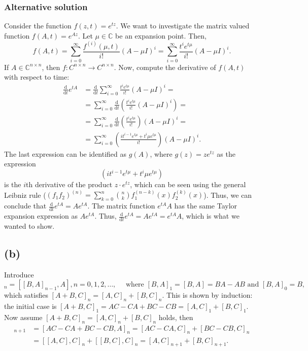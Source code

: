 \subsubsection*{Alternative solution}
Consider the function $f(z,t) = e^{tz}$. We want to investigate the matrix valued function $f(A,t) = e^{Az}$. Let $\mu \in \mathbb{C}$ be an expansion point. Then,
\begin{equation}
  f(A,t) = \sum\limits_{i = 0}^{\infty} \frac{f^{(i)}(\mu,t)}{i!}(A-\mu I)^{i} = \sum\limits_{i = 0}^{\infty} \frac{t^ie^{t\mu}}{i!}(A-\mu I)^{i}.
\end{equation}
If $A\in\mathbb{C}^{n\times n}$, then $f:C^{n \times n}\rightarrow C^{n \times n}$. Now, compute the derivative of $f(A,t)$ with respect to time:
\begin{equation}
\begin{aligned}
\frac{\mathrm d}{\mathrm d t}e^{tA} & = \frac{\mathrm d}{\mathrm dt}\sum^{\infty}_{i = 0} \frac{t^ie^{t\mu}}{i!}(A-\mu I )^i = \\
& = \sum^{\infty}_{i = 0} \frac{\mathrm d}{\mathrm dt}\left(\frac{t^ie^{t\mu}}{i!}(A-\mu I )^i\right) = \\
& = \sum^{\infty}_{i = 0} \frac{\mathrm d}{\mathrm dt}\left(\frac{t^ie^{t\mu}}{i!}\right)(A-\mu I )^i  = \\
&= \sum^{\infty}_{i = 0}  \left(\frac{it^{i-1}e^{t\mu}+t^i\mu e^{t\mu}}{i!}\right) (A-\mu I )^i.
\end{aligned}
\end{equation}
The last expression can be identified as $g(A)$, where $g(z) = ze^{tz}$ as  the expression
\begin{equation}
\left(it^{i-1}e^{t\mu}+t^i\mu e^{t\mu}\right)
\end{equation}
is the $i$th derivative of the product $z\cdot e^{tz}$, which can be seen using the general Leibniz rule ($(f_1f_2)^{(n)} = \sum_{k = 0}^n\binom{n}{k}f_1^{(n-k)}(x)f_2^{(k)}(x)$). Thus, we can conclude that $\frac{\mathrm d }{\mathrm dt}e^{tA} = Ae^{tA}$. The matrix function $e^{tA}A$ has the same Taylor expansion expression as $Ae^{tA}$. Thus, $\frac{\mathrm d }{\mathrm dt}e^{tA} = Ae^{tA} = e^{tA} A$, which is what we wanted to show.

\subsection*{(b)}
Introduce
\begin{equation}
[B,A]_{n} =  [[B,A]_{n-1},A], n = 0,1,2,\ldots, \quad \text{ where }[B,A]_{1} = [B,A] = BA-AB \text{ and } [B,A]_{0} = B,
\end{equation}
which satisfies $[A+B,C]_{n} = [A,C]_{n} + [B,C]_{n}$. This is shown by induction: the initial case is $[A+B,C]_{1} = AC-CA + BC-CB = [A,C]_{1}+[B,C]_{1}$. Now assume $[A+B,C]_{n} = [A,C]_{n} + [B,C]_{n}$ holds, then
\begin{align}
[A+B,C]_{n+1} &=  [AC-CA + BC-CB,A]_{n} = [AC-CA,C]_{n} + [BC-CB,C]_{n} \\
&= [[A,C],C]_{n} + [[B,C],C]_{n}=[A,C]_{n+1} + [B,C]_{n+1}.
\end{align}


